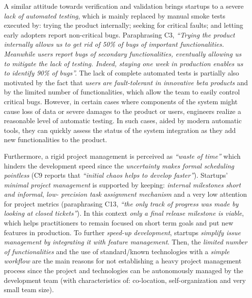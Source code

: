 \documentclass[10pt,journal,letterpaper,compsoc]{IEEEtran}
\begin{document}
A similar attitude towards verification and validation brings startups to a
severe \textit{lack of automated testing}, which is mainly replaced by manual
smoke tests executed by: trying the product internally; seeking for critical
faults; and letting early adopters report non-critical bugs.  Paraphrasing C3,
\textit{``Trying the product internally allows us to get rid of 50\% of bugs of
important functionalities. Meanwhile users report bugs of secondary
functionalities, eventually allowing us to mitigate the lack of testing. Indeed,
staying one week in production enables us to identify 90\% of bugs''.} The lack
of complete automated tests is partially also motivated by the fact that
\textit{users are fault-tolerant in innovative beta products} and  by the
limited number of functionalities, which allow the team to easily control
critical bugs. However, in certain cases where components of the system might
cause loss of data or severe damages to the product or users, engineers realize
a reasonable level of automatic testing. In such cases, aided by modern
automatic tools, they can quickly assess the status of the system integration as
they add new functionalities to the product.

Furthermore, a rigid project management is perceived as \textit{``waste of
time''} which hinders the development speed since the \textit{uncertainty makes
formal scheduling pointless} (C9  reports that \textit{``initial chaos helps to
develop faster''}). Startups' \textit{minimal project management}  is supported
by keeping: \textit{internal milestones short and informal},  \textit{low-
precision task assignment mechanism}  and a very low attention for  project
metrics (paraphrasing C13, \textit{``the only track of progress was made  by
looking at closed tickets''}). In this context \textit{only a final release
milestone is viable}, which helps practitioners to remain focused on short term
goals and put new features in production. To further \textit{speed-up
development}, startups \textit{simplify issue management by integrating it with
feature management}. Then, the \textit{limited number of functionalities} and
the {use of standard/known technologies} with a \textit{simple workflow} are the
main reasons for  not establishing a heavy project management process since the
project and  technologies can be autonomously managed by the development team
(with  characteristics of: co-location, self-organization and very small team
size).  %
\end{document}
